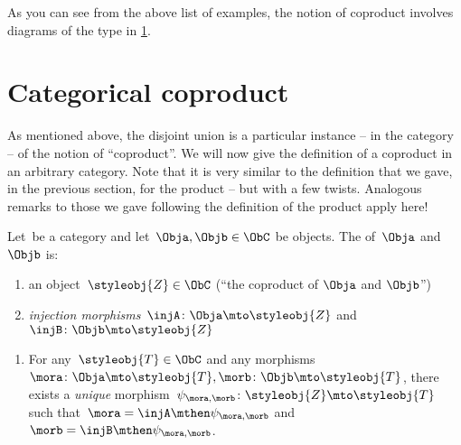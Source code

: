 
As you can see from the above list of examples, the notion of coproduct involves diagrams of the type in \cref{fig:coprod_generic}.

\begin{figure}[h!]
	\centering
	\caption{}
	\label{fig:coprod_generic}
\end{figure}

\section{Categorical coproduct}

As mentioned above, the disjoint union is a particular instance -- in the category \Set  -- of the notion of ``coproduct''.
We will now give the definition of a coproduct in an arbitrary category.
Note that it is very similar to the definition that we gave, in the previous section, for the product -- but with a few twists.
Analogous remarks to those we gave following the definition of the product apply here!

\begin{ctdefinition}
	\label{def:catcoproduct}
	Let~\CatC be a category and let~$\Obja, \Objb \in \ObC$ be objects.
	The \emph{} of~$\Obja$ and~$\Objb$ is:  \\
	\constit
	\begin{enumerate}
		\item an object~$\styleobj{Z} \in \ObC$ (``the coproduct of $\Obja$ and $\Objb$'')
		\item \emph{injection morphisms}~$\injA \colon \Obja \mto \styleobj{Z} $ and~$\injB \colon \Objb \mto \styleobj{Z} $
	\end{enumerate}
	\condit
	\begin{enumerate}
		\item For any~$\styleobj{T} \in \ObC$ and any morphisms~$\mora \colon  \Obja \mto \styleobj{T}, \morb \colon \Objb \mto \styleobj{T}$, there exists a \emph{unique} morphism~$\psi_{\mora, \morb} \colon \styleobj{Z} \mto \styleobj{T}$ such that~$\mora = \injA\mthen \psi_{\mora, \morb}$ and~$\morb = \injB \mthen \psi_{\mora,\morb}$.
	\end{enumerate}
\end{ctdefinition}

